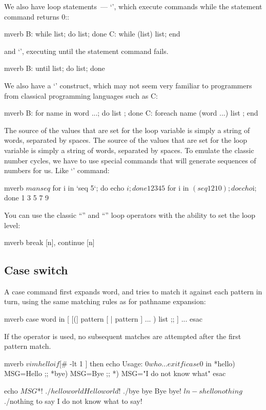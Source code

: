 We also have loop statements~--- `', which execute commands while
the statement command returns 0::
\begin{code}{mverb}
B: while list; do list; done
C: while (list) list; end
\end{code}
and `', executing until the statement command fails.
\begin{code}{mverb}
B: until list; do list; done
\end{code}
We also have a `' construct, which may not seem very familiar to
programmers from classical programming languages such as C:
\begin{code}{mverb}
B: for name in word ...; do list ; done
C: foreach name (word ...) list ; end
\end{code}
The source of the values that are set for the loop variable is simply
a string of words, separated by spaces. The source of the values that are
set for the loop variable is simply a string of words, separated by spaces.
To emulate the classic number cycles, we have to use special commands
that will generate sequences of numbers for us. Like `' command:
\begin{code}{mverb}
$ man seq
$ for i in `seq 5`; do echo $i; done
1
2
3
4
5
$ for i in $(seq 1 2 10); do echo $i; done
1
3
5
7
9
\end{code}
You can use the classic ``'' and ``'' loop operators
with the ability to set the loop level:
\begin{code}{mverb}
break [n], continue [n]
\end{code} %

\subsection*{Case switch} %

A case command first expands word, and tries to match it against each pattern
in turn, using  the  same matching rules as for pathname expansion:
\begin{code}{mverb}
case word in [ [(] pattern [ | pattern ] ... ) list ;; ] ... esac
\end{code}
If the \cmd{;;} operator is used, no subsequent matches are attempted after
the first pattern match.
\begin{code}{mverb}
$ vim hello 
if [ $# -lt 1 ]
then
       echo Usage: $0 who...
       exit
fi

case $0 in
       *hello)
               MSG=Hello
               ;;
       *bye)
               MSG=Bye
               ;;
       *)
               MSG="I do not know what"
esac

echo $MSG $*!
$ ./hello world
Hello world!
$ ./bye bye
Bye bye!
$ ln -s hello nothing
$ ./nothing to say
I do not know what to say!
\end{code} %
